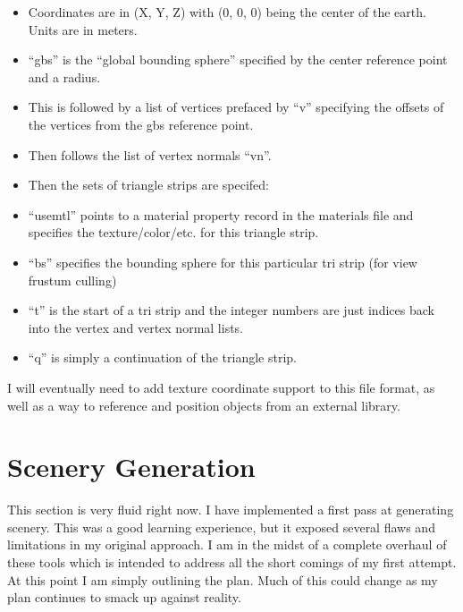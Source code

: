 \documentclass[12pt]{article}
\begin{document}
\begin{itemize}
  
\item Coordinates are in (X, Y, Z) with (0, 0, 0) being the center of
  the earth.  Units are in meters.
  
\item ``gbs'' is the ``global bounding sphere'' specified by the
  center reference point and a radius.
  
\item This is followed by a list of vertices prefaced by ``v''
  specifying the offsets of the vertices from the gbs reference point.
  
\item Then follows the list of vertex normals ``vn''.
  
\item Then the sets of triangle strips are specifed:
  
\item ``usemtl'' points to a material property record in the materials
  file and specifies the texture/color/etc. for this triangle strip.
  
\item ``bs'' specifies the bounding sphere for this particular tri
  strip (for view frustum culling)
  
\item ``t'' is the start of a tri strip and the integer numbers are
  just indices back into the vertex and vertex normal lists.

\item ``q'' is simply a continuation of the triangle strip.
\end{itemize}

I will eventually need to add texture coordinate support to this file
format, as well as a way to reference and position objects from an
external library.


\section{Scenery Generation}

This section is very fluid right now.  I have implemented a first pass
at generating scenery.  This was a good learning experience, but it
exposed several flaws and limitations in my original approach.  I am
in the midst of a complete overhaul of these tools which is intended
to address all the short comings of my first attempt.  At this point I
am simply outlining the plan.  Much of this could change as my plan
continues to smack up against reality.
\end{document}
